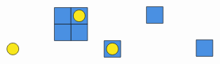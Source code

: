 \documentclass[12pt]{article}
\begin{document}
\[\begin{tikzpicture}[x=0.75pt,y=0.75pt,yscale=-1,xscale=1]
    \draw  [fill={rgb, 255:red, 248; green, 231; blue, 28 }  ,fill opacity=1 ] (117.87,188.37) .. controls (117.87,184.43) and (121.06,181.24) .. (125,181.24) .. controls (128.94,181.24) and (132.13,184.43) .. (132.13,188.37) .. controls (132.13,192.31) and (128.94,195.5) .. (125,195.5) .. controls (121.06,195.5) and (117.87,192.31) .. (117.87,188.37) -- cycle ;
    \draw  [fill={rgb, 255:red, 74; green, 144; blue, 226 }  ,fill opacity=1 ] (235,178.37) -- (255,178.37) -- (255,198.37) -- (235,198.37) -- cycle ;
    \draw  [fill={rgb, 255:red, 74; green, 144; blue, 226 }  ,fill opacity=1 ] (175,138.37) -- (195,138.37) -- (195,158.37) -- (175,158.37) -- cycle ;
    \draw  [fill={rgb, 255:red, 74; green, 144; blue, 226 }  ,fill opacity=1 ] (195,138.37) -- (215,138.37) -- (215,158.37) -- (195,158.37) -- cycle ;
    \draw  [fill={rgb, 255:red, 74; green, 144; blue, 226 }  ,fill opacity=1 ] (195,158.37) -- (215,158.37) -- (215,178.37) -- (195,178.37) -- cycle ;
    \draw  [fill={rgb, 255:red, 74; green, 144; blue, 226 }  ,fill opacity=1 ] (175,158.37) -- (195,158.37) -- (195,178.37) -- (175,178.37) -- cycle ;
    \draw  [fill={rgb, 255:red, 248; green, 231; blue, 28 }  ,fill opacity=1 ] (197.87,148.37) .. controls (197.87,144.43) and (201.06,141.24) .. (205,141.24) .. controls (208.94,141.24) and (212.13,144.43) .. (212.13,148.37) .. controls (212.13,152.31) and (208.94,155.5) .. (205,155.5) .. controls (201.06,155.5) and (197.87,152.31) .. (197.87,148.37) -- cycle ;
    \draw  [fill={rgb, 255:red, 248; green, 231; blue, 28 }  ,fill opacity=1 ] (237.87,188.37) .. controls (237.87,184.43) and (241.06,181.24) .. (245,181.24) .. controls (248.94,181.24) and (252.13,184.43) .. (252.13,188.37) .. controls (252.13,192.31) and (248.94,195.5) .. (245,195.5) .. controls (241.06,195.5) and (237.87,192.31) .. (237.87,188.37) -- cycle ;
    \draw  [fill={rgb, 255:red, 74; green, 144; blue, 226 }  ,fill opacity=1 ] (346,177.37) -- (366,177.37) -- (366,197.37) -- (346,197.37) -- cycle ;
    \draw  [fill={rgb, 255:red, 74; green, 144; blue, 226 }  ,fill opacity=1 ] (286,137.37) -- (306,137.37) -- (306,157.37) -- (286,157.37) -- cycle ;

\end{tikzpicture}\]
\end{document}
